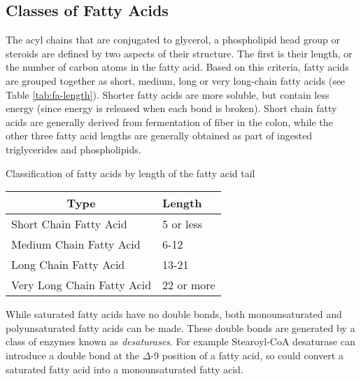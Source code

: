 \documentclass{tufte-handout}
\begin{document}
\subsection{Classes of Fatty Acids}

The acyl chains that are conjugated to glycerol, a phospholipid head group or steroids are defined by two aspects of their structure.  The first is their length, or the number of carbon atoms in the fatty acid.  Based on this criteria, fatty acids are grouped together as short, medium, long or very long-chain fatty acids (see Table \ref{tab:fa-length}).  Shorter fatty acids are more soluble, but contain less energy (since energy is released when each bond is broken).  Short chain fatty acids are generally derived from fermentation of fiber in the colon, while the other three fatty acid lengths are generally obtained as part of ingested triglycerides and phospholipids.

\begin{margintable}
\centering
\caption{Classification of fatty acids by length of the fatty acid tail}
\label{tab:fa-length}
\begin{tabular}{ll}
\hline
\multicolumn{1}{c}{\textbf{Type}} & \textbf{Length} \\ \hline
Short Chain Fatty Acid            & 5 or less       \\
Medium Chain Fatty Acid           & 6-12            \\
Long Chain Fatty Acid             & 13-21           \\
Very Long Chain Fatty Acid        & 22 or more     
\end{tabular}
\end{margintable}

  While saturated fatty acids have no double bonds, both monounsaturated and polyunsaturated fatty acids can be made.  These double bonds are generated by a class of enzymes known as \emph{desaturases}.  For example Stearoyl-CoA desaturase can introduce a double bond at the $\Delta$-9 position of a fatty acid, so could convert a saturated fatty acid into a monounsaturated fatty acid.
\end{document}
